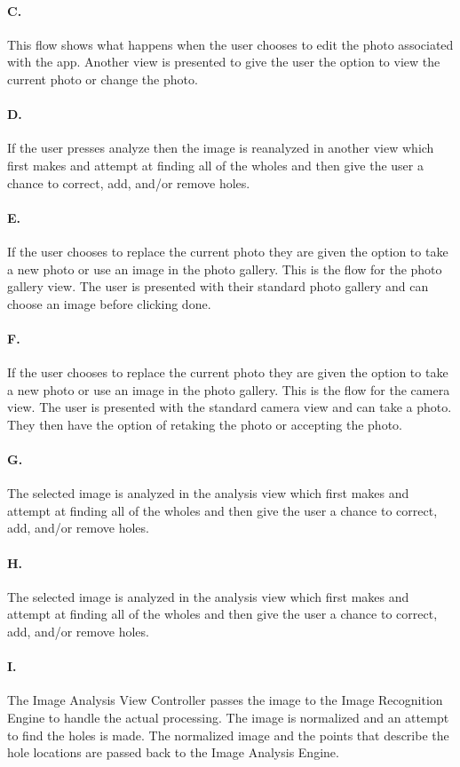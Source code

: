 \paragraph{C.} This flow shows what happens when the user chooses to edit the photo associated with the app. Another view is presented to give the user the option to view the current photo or change the photo.
\paragraph{D.} If the user presses analyze then the image is reanalyzed in another view which first makes and attempt at finding all of the wholes and then give the user a chance to correct, add, and/or remove holes.
\paragraph{E.} If the user chooses to replace the current photo they are given the option to take a new photo or use an image in the photo gallery. This is the flow for the photo gallery view. The user is presented with their standard photo gallery and can choose an image before clicking done.
\paragraph{F.} If the user chooses to replace the current photo they are given the option to take a new photo or use an image in the photo gallery. This is the flow for the camera view. The user is presented with the standard camera view and can take a photo. They then have the option of retaking the photo or accepting the photo.
\paragraph{G.} The selected image is analyzed in the analysis view which first makes and attempt at finding all of the wholes and then give the user a chance to correct, add, and/or remove holes.
\paragraph{H.} The selected image is analyzed in the analysis view which first makes and attempt at finding all of the wholes and then give the user a chance to correct, add, and/or remove holes.
\paragraph{I.} The Image Analysis View Controller passes the image to the Image Recognition Engine to handle the actual processing. The image is normalized and an attempt to find the holes is made. The normalized image and the points that describe the hole locations are passed back to the Image Analysis Engine.
